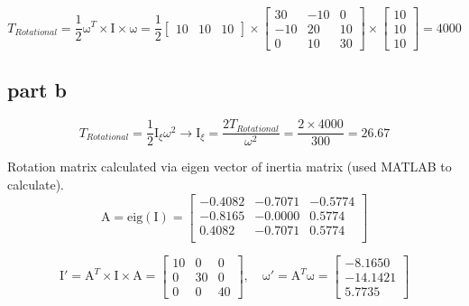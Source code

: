 \begin{equation}
T_{Rotational} = \dfrac{1}{2}\boldsymbol{\mathrm{\omega}}^T\times \boldsymbol{\mathrm{I}} \times \boldsymbol{\mathrm{\omega}} = \dfrac{1}{2} \begin{bmatrix}
    10&
    10&
    10
\end{bmatrix}\times
\begin{bmatrix}
    30 & -10 & 0 \\
    -10 & 20 & 10\\
    0 & 10 & 30
\end{bmatrix}\times
\begin{bmatrix}
    10\\
    10\\
    10
\end{bmatrix} = 4000
\end{equation}
\subsection{part b}
\begin{equation}
    T_{Rotational} = \dfrac{1}{2} \mathrm{I}_{\xi} \omega^2 \rightarrow \mathrm{I}_{\xi} = \dfrac{2T_{Rotational}}{\omega^2} = \dfrac{2\times 4000}{300} = 26.67
\end{equation}

Rotation matrix calculated via eigen vector of inertia matrix (used MATLAB to calculate).
\begin{equation}
    \boldsymbol{\mathrm{A}} = \mathrm{eig}(\boldsymbol{\mathrm{I}}) = \begin{bmatrix}
        -0.4082&   -0.7071&   -0.5774\\
        -0.8165&   -0.0000&    0.5774\\
         0.4082&   -0.7071&    0.5774\\
    \end{bmatrix}
\end{equation}

$$
\boldsymbol{\mathrm{I}}' = \boldsymbol{\mathrm{A}}^T \times \boldsymbol{\mathrm{I}} \times \boldsymbol{\mathrm{A}} = \begin{bmatrix}
    10 & 0  & 0 \\
    0  & 30 & 0\\
    0  & 0  & 40
\end{bmatrix}, \quad \boldsymbol{\mathrm{\omega}}' = \boldsymbol{\mathrm{A}}^T \boldsymbol{\mathrm{\omega}} = \begin{bmatrix}
    -8.1650\\
    -14.1421\\
      5.7735
\end{bmatrix}
$$


